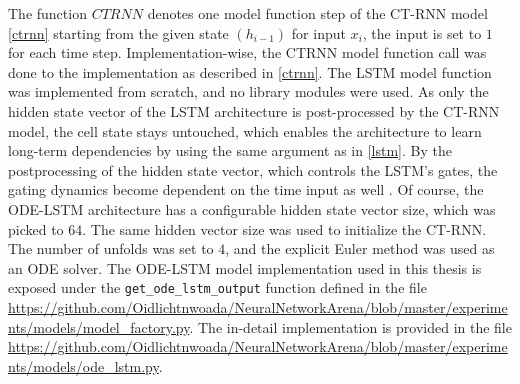 \documentclass[draft,final]{vutinfth} %
\begin{document}
    The function $CTRNN$ denotes one model function step of the CT-RNN model \ref{ctrnn} starting from the given state $(h_{i-1})$ for input $x_i$, the input is set to $1$ for each time step.
    Implementation-wise, the CTRNN model function call was done to the implementation as described in \ref{ctrnn}.
    The LSTM model function was implemented from scratch, and no library modules were used.
    As only the hidden state vector of the LSTM architecture is post-processed by the CT-RNN model, the cell state stays untouched, which enables the architecture to learn long-term dependencies by using the same argument as in \ref{lstm}.
    By the postprocessing of the hidden state vector, which controls the LSTM's gates, the gating dynamics become dependent on the time input as well \cite[p. 4]{ODELSTM}.
    Of course, the ODE-LSTM architecture has a configurable hidden state vector size, which was picked to $64$.
    The same hidden vector size was used to initialize the CT-RNN. The number of unfolds was set to $4$, and the explicit Euler method was used as an ODE solver.
    The ODE-LSTM model implementation used in this thesis is exposed under the \texttt{get\_ode\_lstm\_output} function defined in the file \url{https://github.com/Oidlichtnwoada/NeuralNetworkArena/blob/master/experiments/models/model_factory.py}.
    The in-detail implementation is provided in the file \url{https://github.com/Oidlichtnwoada/NeuralNetworkArena/blob/master/experiments/models/ode_lstm.py}.
\end{document}
